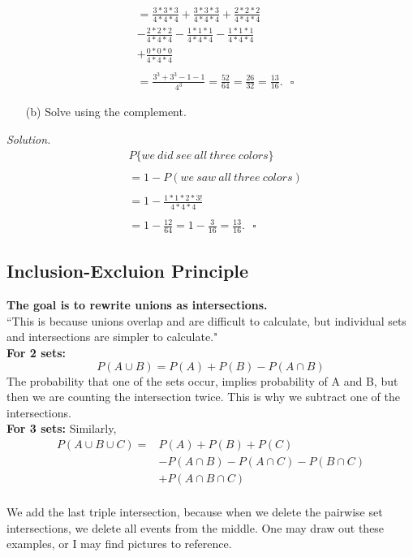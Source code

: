 \documentclass[12pt]{book}
\begin{document}
\begin{align*}
&=\frac{3*3*3}{4*4*4} + \frac{3*3*3}{4*4*4} + \frac{2*2*2}{4*4*4}\\
&-\frac{2*2*2}{4*4*4} - \frac{1*1*1}{4*4*4} - \frac{1*1*1}{4*4*4}\\
&+\frac{0*0*0}{4*4*4}\\\\
&=\frac{3^{3}+3^{3}-1-1}{4^{3}}=\frac{52}{64} = \frac{26}{32} = \frac{13}{16}.~~~\square
\end{align*}
\begin{itemize}\item[(b)] Solve using the complement.\end{itemize}
\textit{Solution. }\\
\begin{align*}
&P\{we~did~see~all~three~colors\}\\\\
&=1-P(we~saw~all~three~colors)\\\\
&=1- \frac{1*1*2*3!}{4*4*4}\\\\
&=1- \frac{12}{64} = 1- \frac{3}{16} =\frac{13}{16}.~~~\square
\end{align*}




\subsection{Inclusion-Excluion Principle}
\textbf{The goal is to rewrite unions as intersections. } \\``This is because unions overlap and are difficult to calculate, but individual sets and intersections are simpler to calculate."\\
\newpage
\noindent \textbf{For 2 sets: }
$$P(A \cup B) = P(A) + P(B) - P(A \cap B)$$
The probability that one of the sets occur, implies probability of A and B, but then we are counting the intersection twice. This is why we subtract one of the intersections.\\

\noindent \textbf{For 3 sets: }
Similarly,
\begin{align*}
P(A\cup B \cup C)=&P(A)+P(B)+P(C)\\
&-P(A\cap B) - P(A\cap C) - P(B\cap C) \\
&+ P(A\cap B\cap C)\\
\end{align*}

We add the last triple intersection, because when we delete the pairwise set intersections, we delete all events from the middle. One may draw out these examples, or I may find pictures to reference.\\
\end{document}
